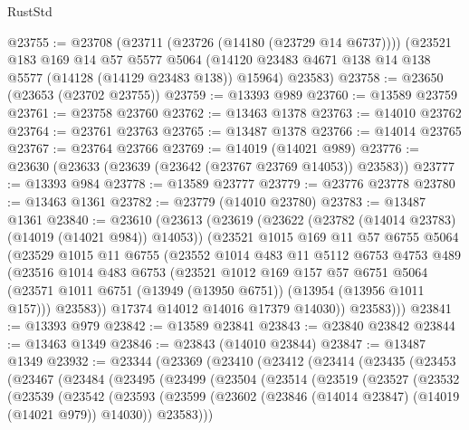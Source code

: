 \begin{lexlean}{RustStd}
\begin{coremodule}
@23755 := @23708
    (@23711 (@23726 (@14180 (@23729 @14 @6737))))
    (@23521
      @183
      @169
      @14
      @57
      @5577
      @5064
      (@14120 @23483 @4671 @138 @14 @138 @5577 (@14128 (@14129 @23483 @138)) @15964)
      @23583)
@23758 := @23650 (@23653 (@23702 @23755))
@23759 := @13393 @989
@23760 := @13589 @23759
@23761 := @23758 @23760
@23762 := @13463 @1378
@23763 := @14010 @23762
@23764 := @23761 @23763
@23765 := @13487 @1378
@23766 := @14014 @23765
@23767 := @23764 @23766
@23769 := @14019 (@14021 @989)
@23776 := @23630 (@23633 (@23639 (@23642 (@23767 @23769 @14053)) @23583))
@23777 := @13393 @984
@23778 := @13589 @23777
@23779 := @23776 @23778
@23780 := @13463 @1361
@23782 := @23779 (@14010 @23780)
@23783 := @13487 @1361
@23840 := @23610
    (@23613
      (@23619
        (@23622 (@23782 (@14014 @23783) (@14019 (@14021 @984)) @14053))
        (@23521
          @1015
          @169
          @11
          @57
          @6755
          @5064
          (@23529
            @1015
            @11
            @6755
            (@23552
              @1014
              @483
              @11
              @5112
              @6753
              @4753
              @489
              (@23516
                @1014
                @483
                @6753
                (@23521
                  @1012
                  @169
                  @157
                  @57
                  @6751
                  @5064
                  (@23571 @1011 @6751 (@13949 (@13950 @6751)) (@13954 (@13956 @1011 @157)))
                  @23583))
              @17374
              @14012
              @14016
              @17379
              @14030))
          @23583)))
@23841 := @13393 @979
@23842 := @13589 @23841
@23843 := @23840 @23842
@23844 := @13463 @1349
@23846 := @23843 (@14010 @23844)
@23847 := @13487 @1349
@23932 := @23344
    (@23369
      (@23410
        (@23412
          (@23414
            (@23435
              (@23453
                (@23467
                  (@23484
                    (@23495
                      (@23499
                        (@23504
                          (@23514
                            (@23519
                              (@23527
                                (@23532
                                  (@23539
                                    (@23542
                                      (@23593
                                        (@23599
                                          (@23602
                                            (@23846 (@14014 @23847) (@14019 (@14021 @979)) @14030))
                                          @23583)))

\end{coremodule}
\end{lexlean}
